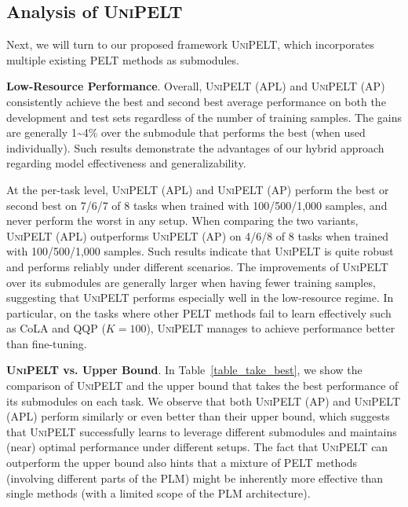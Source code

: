 \subsection{Analysis of \textsc{UniPELT}}
Next, we will turn to our proposed framework \textsc{UniPELT}, which incorporates multiple existing PELT methods as submodules.

{{\bf Low-Resource Performance}.} Overall, \textsc{UniPELT} (APL) and \textsc{UniPELT} (AP) consistently achieve the best and second best average performance on both the development and test sets regardless of the number of training samples. The gains are generally 1\textasciitilde4\% over the submodule that performs the best (when used individually). Such results demonstrate the advantages of our hybrid approach regarding model effectiveness and generalizability.

At the per-task level, \textsc{UniPELT} (APL) and \textsc{UniPELT} (AP) perform the best or second best on 7/6/7 of 8 tasks when trained with 100/500/1,000 samples, and never perform the worst in any setup. When comparing the two variants, \textsc{UniPELT} (APL) outperforms \textsc{UniPELT} (AP) on 4/6/8 of 8 tasks when trained with 100/500/1,000 samples. Such results indicate that \textsc{UniPELT} is quite robust and performs reliably under different scenarios. The improvements of \textsc{UniPELT} over its submodules are generally larger when having fewer training samples, suggesting that \textsc{UniPELT} performs especially well in the low-resource regime. In particular, on the tasks where other PELT methods fail to learn effectively such as CoLA and QQP ($K=100$), \textsc{UniPELT} manages to achieve performance better than fine-tuning.

{{\bf \textsc{UniPELT} vs. Upper Bound}.} In Table~\ref{table_take_best}, we show the comparison of \textsc{UniPELT} and the upper bound that takes the best performance of its submodules on each task. We observe that both \textsc{UniPELT} (AP) and \textsc{UniPELT} (APL) perform similarly or even better than their upper bound, which suggests that \textsc{UniPELT} successfully learns to leverage different submodules and maintains (near) optimal performance under different setups. The fact that \textsc{UniPELT} can outperform the upper bound also hints that a mixture of PELT methods (involving different parts of the PLM) might be inherently more effective than single methods (with a limited scope of the PLM architecture).

